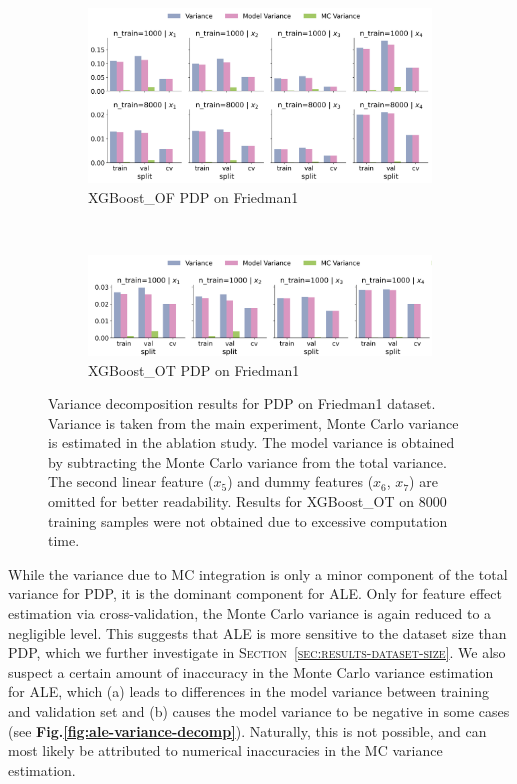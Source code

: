 \documentclass[runningheads]{llncs}
\begin{document}
\begin{figure}[htbp]
    \centering
    \begin{subfigure}[b]{0.75\textwidth}
        \includegraphics[width=\textwidth]{img/variance_decomposition_pdp_XGBoost_OF.png}
        \caption{XGBoost\_OF PDP on Friedman1}
    \end{subfigure}
    \\[10pt]
    \vfill
    \begin{subfigure}[b]{0.75\textwidth}
        \includegraphics[width=\textwidth]{img/variance_decomposition_pdp_XGBoost_OT.png}
        \caption{XGBoost\_OT PDP on Friedman1}
    \end{subfigure}
    \caption{Variance decomposition results for PDP on Friedman1 dataset. Variance is taken from the
    main experiment, Monte Carlo variance is estimated in the ablation study. The model variance is
    obtained by subtracting the Monte Carlo variance from the total variance. The second linear feature
    ($x_5$) and dummy features ($x_6$, $x_7$) are omitted for better readability. Results for XGBoost\_OT
    on 8000 training samples were not obtained due to excessive computation time.}
    \label{fig:pdp-variance-decomp}  %
\end{figure}

While the variance due to MC integration is only a minor component of the total variance for PDP, it is the
dominant component for ALE. Only for feature effect estimation via cross-validation, the Monte Carlo variance  %
is again reduced to a negligible level. This suggests that ALE is more sensitive to the dataset size than PDP,
which we further investigate in \textsc{Section~\ref{sec:results-dataset-size}}. We also suspect a certain
amount of inaccuracy in the Monte Carlo variance estimation for ALE, which (a) leads to differences in the
model variance between training and validation set and (b) causes the model variance to be negative in some cases
(see \textbf{Fig.\@\ref{fig:ale-variance-decomp}}).
Naturally, this is not possible, and can most likely be attributed to numerical inaccuracies in the MC variance estimation.
\end{document}
